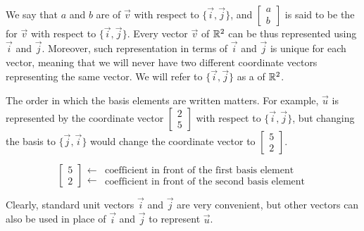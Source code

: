 \documentclass{ximera}
\begin{document}
 We say that $a$ and $b$ are  of $\vec{v}$ with respect to $\{\vec{i}, \vec{j}\}$, and $\begin{bmatrix}a\\b\end{bmatrix}$ is said to be the  for $\vec{v}$ with respect to $\{\vec{i}, \vec{j}\}$.  Every vector $\vec{v}$ of $\mathbb{R}^2$ can be thus represented using $\vec{i}$ and $\vec{j}$.  Moreover, such representation in terms of $\vec{i}$ and $\vec{j}$ is unique for each vector, meaning that we will never have two different coordinate vectors representing the same vector. We will refer to $\{\vec{i}, \vec{j}\}$ as a  of $\mathbb{R}^2$.  
 
 The order in which the basis elements are written matters.  For example, $\vec{u}$ is represented by the coordinate vector $\begin{bmatrix}2\\5\end{bmatrix}$ with respect to $\{\vec{i}, \vec{j}\}$, but changing the basis to $\{\vec{j}, \vec{i}\}$ would change the coordinate vector to $\begin{bmatrix}5\\2\end{bmatrix}$.
 
 $$\left[\begin{array}{c}  
 5\\2
 \end{array}\right]
 \begin{array}{c}
 
 \longleftarrow\\
 \longleftarrow

 \end{array}
\begin{array}{c}  
 \mbox{coefficient in front of the first basis element }\\\mbox{coefficient in front of the second basis element}
 \end{array}$$
 
 Clearly, standard unit vectors $\vec{i}$ and $\vec{j}$ are very convenient, but other vectors can also be used in place of $\vec{i}$ and $\vec{j}$ to represent $\vec{u}$.
 
\end{document}
